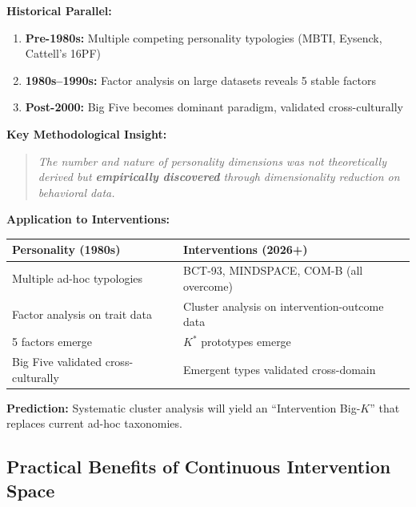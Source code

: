 \begin{tcolorbox}[colback=green!5!white, colframe=green!50!black,
    title=\textbf{Observation ($\omicron$): Factor-Analytic Discovery of Personality Dimensions}]

\textbf{Historical Parallel:}

\begin{enumerate}[nosep]
    \item \textbf{Pre-1980s:} Multiple competing personality typologies (MBTI, Eysenck, Cattell's 16PF)
    \item \textbf{1980s--1990s:} Factor analysis on large datasets reveals 5 stable factors
    \item \textbf{Post-2000:} Big Five becomes dominant paradigm, validated cross-culturally
\end{enumerate}

\textbf{Key Methodological Insight:}
\begin{quote}
\textit{The number and nature of personality dimensions was not theoretically derived but \textbf{empirically discovered} through dimensionality reduction on behavioral data.}
\end{quote}

\textbf{Application to Interventions:}
\begin{center}
\begin{tabular}{p{5cm}p{6cm}}
\toprule
\textbf{Personality (1980s)} & \textbf{Interventions (2026+)} \\
\midrule
Multiple ad-hoc typologies & BCT-93, MINDSPACE, COM-B (all overcome) \\
Factor analysis on trait data & Cluster analysis on intervention-outcome data \\
5 factors emerge & $K^*$ prototypes emerge \\
Big Five validated cross-culturally & Emergent types validated cross-domain \\
\bottomrule
\end{tabular}
\end{center}

\textbf{Prediction:} Systematic cluster analysis will yield an ``Intervention Big-$K$'' that replaces current ad-hoc taxonomies.

\end{tcolorbox}

\subsection{Practical Benefits of Continuous Intervention Space}
\label{subsec:practical-benefits-continuous}

